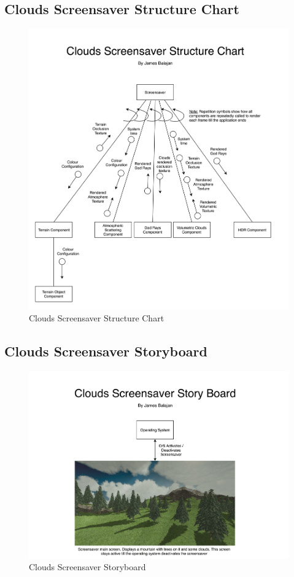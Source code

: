 \documentclass[10pt, openany]{book}
\begin{document}
\subsection{Clouds Screensaver Structure Chart}
\begin{figure}[H]
	\centering
	\includegraphics[width=1.0\linewidth]{Clouds Screensaver Structure Chart}
	\caption{Clouds Screensaver Structure Chart}
	\label{app:clouds-struc}
\end{figure}
\newpage

\subsection{Clouds Screensaver Storyboard}
\begin{figure}[H]
	\centering
	\includegraphics[width=1.0\linewidth]{Clouds Screensaver Storyboard}
	\caption{Clouds Screensaver Storyboard}
	\label{app:clouds-story}
\end{figure}
\newpage
\end{document}
